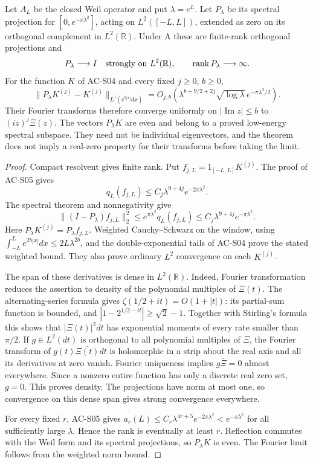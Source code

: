 \begin{theorem}
\label{AC-S18}
Let \(A_L\) be the closed Weil operator and put \(\lambda=e^L\).
Let \(P_\lambda\) be its spectral projection for
\([0,e^{-\pi\lambda^2}]\), acting on \(L^2([-L,L])\), extended
as zero on its orthogonal complement in \(L^2(\mathbb R)\).
Under A these are finite-rank orthogonal projections and
\[
 P_\lambda\longrightarrow I\quad\hbox{strongly on }L^2(\mathbb R),
 \qquad \operatorname{rank}P_\lambda\longrightarrow\infty.
\]
For the function \(K\) of AC-S04 and every fixed \(j\geq0\),
\(b\geq0\),
\[
 \|P_\lambda K^{(j)}-K^{(j)}\|_{L^1(e^{b|x|}dx)}
  =O_{j,b}\!\left(
    \lambda^{b+9/2+2j}\sqrt{\log\lambda}\,
                         e^{-\pi\lambda^2/2}\right).
\]
Their Fourier transforms therefore converge uniformly on
\(|\operatorname{Im}z|\leq b\) to \((iz)^j\Xi(z)\).
The vectors \(P_\lambda K\) are even and belong to a proved
low-energy spectral subspace.  They need not be individual
eigenvectors, and the theorem does not imply a real-zero property
for their transforms before taking the limit.
\end{theorem}
\begin{proof}
Compact resolvent gives finite rank.  Put
\(f_{j,L}=1_{[-L,L]}K^{(j)}\).  The proof of AC-S05 gives
\[
 q_L(f_{j,L})\leq C_j\lambda^{9+4j}e^{-2\pi\lambda^2}.
\]
The spectral theorem and nonnegativity give
\[
 \|(I-P_\lambda)f_{j,L}\|_2^2
    \leq e^{\pi\lambda^2}q_L(f_{j,L})
    \leq C_j\lambda^{9+4j}e^{-\pi\lambda^2}.
\]
Here \(P_\lambda K^{(j)}=P_\lambda f_{j,L}\).
Weighted Cauchy--Schwarz on the window, using
\(\int_{-L}^Le^{2b|x|}dx\leq2L\lambda^{2b}\), and the
double-exponential tails of AC-S04 prove the stated weighted bound.
They also prove ordinary \(L^2\) convergence on each \(K^{(j)}\).

The span of these derivatives is dense in \(L^2(\mathbb R)\).
Indeed, Fourier transformation reduces the assertion to density of
the polynomial multiples of \(\Xi(t)\).  The alternating-series
formula gives \(\zeta(1/2+it)=O(1+|t|)\): its partial-sum function
is bounded, and \(|1-2^{1/2-it}|\geq\sqrt2-1\).
Together with Stirling's formula this shows that \(|\Xi(t)|^2dt\)
has exponential moments of every rate smaller than \(\pi/2\).
If \(g\in L^2(dt)\) is orthogonal to all polynomial multiples of
\(\Xi\), the Fourier transform of
\(g(t)\overline{\Xi(t)}dt\) is holomorphic in a strip about the
real axis and all its derivatives at zero vanish.  Fourier uniqueness
implies \(g\overline\Xi=0\) almost everywhere.  Since a nonzero
entire function has only a discrete real zero set, \(g=0\).
This proves density.  The projections have norm at most one, so
convergence on this dense span gives strong convergence everywhere.

For every fixed \(r\), AC-S05 gives
\(a_r(L)\leq C_r\lambda^{4r+5}e^{-2\pi\lambda^2}
 <e^{-\pi\lambda^2}\) for all sufficiently large \(\lambda\).
Hence the rank is eventually at least \(r\).  Reflection commutes
with the Weil form and its spectral projections, so \(P_\lambda K\)
is even.  The Fourier limit follows from the weighted norm bound.
\end{proof}

